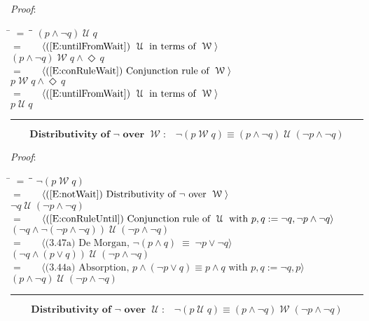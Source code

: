\documentclass[12pt, fleqn, leqno]{article}
\newcommand{\lgap}{2pt}                             %
\newcommand{\mymathindent}{24pt}                    %
\newcommand{\equivs}{\ensuremath{\;\equiv\;}}       %
\newcommand{\Until}{\;\mathcal{U}\;}
\newcommand{\Wait}{\;\mathcal{W}\;}
\newcommand{\Event}{\Diamond\,}
\newcommand{\myqed}{\rule[-.23ex]{1.2ex}{2.0ex}}
\newcommand{\myqedtab}{\hspace{384pt}}              %
\newcommand{\Gll} {\langle}                         %
\newcommand{\Ggg} {\rangle}                         %
\newcommand{\Hint}[1]     {\ \ \ $\Gll              \mbox{#1} \Ggg$ }   %
\begin{document}
\emph{Proof}:
\begin{tabbing}
\hspace{\mymathindent} \= $= \;$ \= \myqedtab \= \kill
\> \> $(p\land \neg q)\Until q$\\[\lgap]
\> $=$ \> \Hint{(\ref{E:untilFromWait}) $\Until$ in terms of $\Wait$} \\[\lgap]
\> \> $(p\land \neg q)\Wait q \land \Event q$\\[\lgap]
\> $=$ \> \Hint{(\ref{E:conRuleWait}) Conjunction rule of $\Wait$} \\[\lgap]
\> \> $p\Wait q \land \Event q$\\[\lgap]
\> $=$ \> \Hint{(\ref{E:untilFromWait}) $\Until$ in terms of $\Wait$} \\[\lgap]
\> \> $p \Until q$ \quad \myqed
\end{tabbing}
\begin{equation}\label{E:notWait2}
\textbf{Distributivity of $\neg$ over $\Wait$:}\quad \neg(p\Wait q)\equiv (p\land \neg q)\Until(\neg p\land \neg q)
\end{equation}

\emph{Proof}:
\begin{tabbing}
\hspace{\mymathindent} \= $= \;$ \= \myqedtab \= \kill
\> \> $\neg (p\Wait q)$\\[\lgap]
\> $=$ \> \Hint{(\ref{E:notWait}) Distributivity of $\neg$ over $\Wait$} \\[\lgap]
\> \> $\neg q \Until (\neg p \land \neg q)$\\[\lgap]
\> $=$ \> \Hint{(\ref{E:conRuleUntil}) Conjunction rule of $\Until$ with $p,q:=\neg q, \neg p\land\neg q$} \\[\lgap]
\> \> $(\neg q \land \neg(\neg p \land \neg q)) \Until (\neg p \land \neg q)$\\[\lgap]
\> $=$  \>  \Hint{(3.47a) De Morgan, $\neg(p\land q)\equivs \neg p\lor\neg q$}\\[\lgap]
\> \> $(\neg q \land (p \lor q)) \Until (\neg p \land \neg q)$\\[\lgap]
\> $=$ \> \Hint{(3.44a) Absorption, $p\land (\neg p\lor q)\equiv p\land q$ with $p,q:=\neg q,p$} \\[\lgap]
\> \> $(p \land \neg q) \Until (\neg p \land \neg q)$ \quad \myqed
\end{tabbing}
\begin{equation}\label{E:notUntil2}
\textbf{Distributivity of $\neg$ over $\Until$:}\quad \neg(p\Until q)\equiv (p\land \neg q)\Wait(\neg p\land \neg q)
\end{equation}
\end{document}
